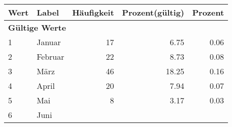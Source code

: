      \begin{longtable}{lXrrr}
     \toprule
     \textbf{Wert} & \textbf{Label} & \textbf{Häufigkeit} & \textbf{Prozent(gültig)} & \textbf{Prozent} \\
     \endhead
     \midrule
     \multicolumn{5}{l}{\textbf{Gültige Werte}}\\

     1 &
     \multicolumn{1}{X}{ Januar   } &


       \num{17} &
       \num[round-mode=places,round-precision=2]{6.75} &
         \num[round-mode=places,round-precision=2]{0.06} \\

     2 &
     \multicolumn{1}{X}{ Februar   } &


       \num{22} &
       \num[round-mode=places,round-precision=2]{8.73} &
         \num[round-mode=places,round-precision=2]{0.08} \\

     3 &
     \multicolumn{1}{X}{ März   } &


       \num{46} &
       \num[round-mode=places,round-precision=2]{18.25} &
         \num[round-mode=places,round-precision=2]{0.16} \\

     4 &
     \multicolumn{1}{X}{ April   } &


       \num{20} &
       \num[round-mode=places,round-precision=2]{7.94} &
         \num[round-mode=places,round-precision=2]{0.07} \\

     5 &
     \multicolumn{1}{X}{ Mai   } &


       \num{8} &
       \num[round-mode=places,round-precision=2]{3.17} &
         \num[round-mode=places,round-precision=2]{0.03} \\

     6 &
     \multicolumn{1}{X}{ Juni   } &



\end{longtable}
